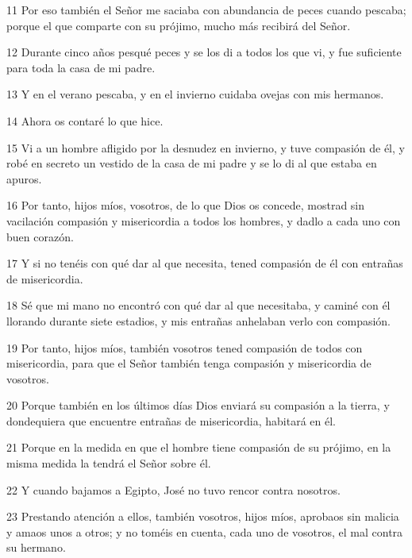\par 11 Por eso también el Señor me saciaba con abundancia de peces cuando pescaba; porque el que comparte con su prójimo, mucho más recibirá del Señor.

\par 12 Durante cinco años pesqué peces y se los di a todos los que vi, y fue suficiente para toda la casa de mi padre.

\par 13 Y en el verano pescaba, y en el invierno cuidaba ovejas con mis hermanos.

\par 14 Ahora os contaré lo que hice.

\par 15 Vi a un hombre afligido por la desnudez en invierno, y tuve compasión de él, y robé en secreto un vestido de la casa de mi padre y se lo di al que estaba en apuros.

\par 16 Por tanto, hijos míos, vosotros, de lo que Dios os concede, mostrad sin vacilación compasión y misericordia a todos los hombres, y dadlo a cada uno con buen corazón.

\par 17 Y si no tenéis con qué dar al que necesita, tened compasión de él con entrañas de misericordia.

\par 18 Sé que mi mano no encontró con qué dar al que necesitaba, y caminé con él llorando durante siete estadios, y mis entrañas anhelaban verlo con compasión.

\par 19 Por tanto, hijos míos, también vosotros tened compasión de todos con misericordia, para que el Señor también tenga compasión y misericordia de vosotros.

\par 20 Porque también en los últimos días Dios enviará su compasión a la tierra, y dondequiera que encuentre entrañas de misericordia, habitará en él.

\par 21 Porque en la medida en que el hombre tiene compasión de su prójimo, en la misma medida la tendrá el Señor sobre él.

\par 22 Y cuando bajamos a Egipto, José no tuvo rencor contra nosotros.

\par 23 Prestando atención a ellos, también vosotros, hijos míos, aprobaos sin malicia y amaos unos a otros; y no toméis en cuenta, cada uno de vosotros, el mal contra su hermano.


